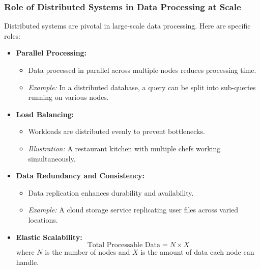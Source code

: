 \documentclass{beamer}
\begin{document}
\begin{frame}[fragile]
    \frametitle{Role of Distributed Systems in Data Processing at Scale}
    Distributed systems are pivotal in large-scale data processing. Here are specific roles:
    
    \begin{itemize}
        \item \textbf{Parallel Processing:} 
            \begin{itemize}
                \item Data processed in parallel across multiple nodes reduces processing time.
                \item \textit{Example:} In a distributed database, a query can be split into sub-queries running on various nodes.
            \end{itemize}
        
        \item \textbf{Load Balancing:} 
            \begin{itemize}
                \item Workloads are distributed evenly to prevent bottlenecks.
                \item \textit{Illustration:} A restaurant kitchen with multiple chefs working simultaneously.
            \end{itemize}
        
        \item \textbf{Data Redundancy and Consistency:} 
            \begin{itemize}
                \item Data replication enhances durability and availability.
                \item \textit{Example:} A cloud storage service replicating user files across varied locations.
            \end{itemize}
        
        \item \textbf{Elastic Scalability:}
            \begin{equation}
            \text{Total Processable Data} = N \times X
            \end{equation}
            where $N$ is the number of nodes and $X$ is the amount of data each node can handle.
    \end{itemize}
\end{frame}
\end{document}
